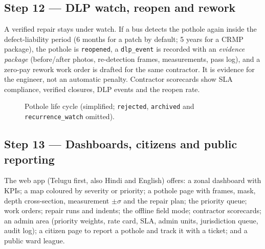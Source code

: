 \documentclass[11pt,a4paper]{article}
\newcommand{\code}[1]{\texttt{\small #1}}
\begin{document}
\subsection{Step 12 --- DLP watch, reopen and rework}
A verified repair stays under watch. If a bus detects the pothole again inside the defect-liability period (6
months for a patch by default; 5 years for a CRMP package), the pothole is \code{reopened}, a \code{dlp\_event} is
recorded with an \emph{evidence package} (before/after photos, re-detection frames, measurements, pass log), and a
zero-pay rework work order is drafted for the same contractor. It is evidence for the engineer, not an automatic
penalty. Contractor scorecards show SLA compliance, verified closures, DLP events and the reopen rate.

\begin{figure}[h]
\centering
{}
\caption{Pothole life cycle (simplified; \code{rejected}, \code{archived} and \code{recurrence\_watch} omitted).}
\end{figure}

\subsection{Step 13 --- Dashboards, citizens and public reporting}
The web app (Telugu first, also Hindi and English) offers: a zonal dashboard with KPIs; a map coloured by severity
or priority; a pothole page with frames, mask, depth cross-section, measurement $\pm\sigma$ and the repair plan; the
priority queue; work orders; repair runs and indents; the offline field mode; contractor scorecards; an admin area
(priority weights, rate card, SLA, admin units, jurisdiction queue, audit log); a citizen page to report a pothole
and track it with a ticket; and a public ward league.
\end{document}

